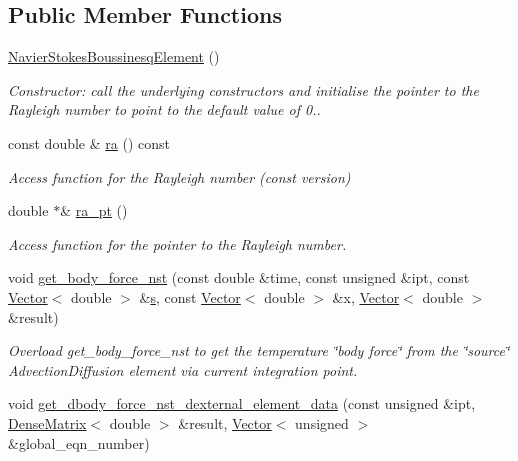 \subsection*{Public Member Functions}
\begin{DoxyCompactItemize}
\item 
\hyperlink{classoomph_1_1NavierStokesBoussinesqElement_ad0ebb74a3963c0715e6e3e34ba8b1d7f}{Navier\+Stokes\+Boussinesq\+Element} ()
\begin{DoxyCompactList}\small\item\em Constructor\+: call the underlying constructors and initialise the pointer to the Rayleigh number to point to the default value of 0.. \end{DoxyCompactList}\item 
const double \& \hyperlink{classoomph_1_1NavierStokesBoussinesqElement_a3318acc1306c60bd13b3bfe8e15a2fa5}{ra} () const
\begin{DoxyCompactList}\small\item\em Access function for the Rayleigh number (const version) \end{DoxyCompactList}\item 
double $\ast$\& \hyperlink{classoomph_1_1NavierStokesBoussinesqElement_ac822ef74e7bc0e55c917e58f2cd5a6fe}{ra\+\_\+pt} ()
\begin{DoxyCompactList}\small\item\em Access function for the pointer to the Rayleigh number. \end{DoxyCompactList}\item 
void \hyperlink{classoomph_1_1NavierStokesBoussinesqElement_a2ff5be3155df975541a25444d43c1ca8}{get\+\_\+body\+\_\+force\+\_\+nst} (const double \&time, const unsigned \&ipt, const \hyperlink{classoomph_1_1Vector}{Vector}$<$ double $>$ \&\hyperlink{cfortran_8h_ab7123126e4885ef647dd9c6e3807a21c}{s}, const \hyperlink{classoomph_1_1Vector}{Vector}$<$ double $>$ \&x, \hyperlink{classoomph_1_1Vector}{Vector}$<$ double $>$ \&result)
\begin{DoxyCompactList}\small\item\em Overload get\+\_\+body\+\_\+force\+\_\+nst to get the temperature \char`\"{}body force\char`\"{} from the \char`\"{}source\char`\"{} Advection\+Diffusion element via current integration point. \end{DoxyCompactList}\item 
void \hyperlink{classoomph_1_1NavierStokesBoussinesqElement_a8a84c39e2156ab16b7aefc400891ac27}{get\+\_\+dbody\+\_\+force\+\_\+nst\+\_\+dexternal\+\_\+element\+\_\+data} (const unsigned \&ipt, \hyperlink{classoomph_1_1DenseMatrix}{Dense\+Matrix}$<$ double $>$ \&result, \hyperlink{classoomph_1_1Vector}{Vector}$<$ unsigned $>$ \&global\+\_\+eqn\+\_\+number)

\end{DoxyCompactItemize}
